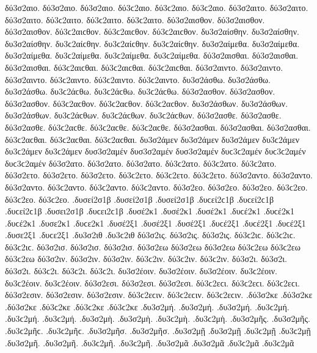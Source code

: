 {δύ3σ2αιο. δύ3σ2αιο. δύ3σ2αιο. δύ3ϲ2αιο. δύ3ϲ2αιο. δύ3ϲ2αιο. 
δύ3σ2αιτο. δύ3σ2αιτο. δύ3σ2αιτο. δύ3ϲ2αιτο. δύ3ϲ2αιτο. δύ3ϲ2αιτο. 
δύ3σ2αισθον. δύ3σ2αισθον. δύ3σ2αισθον. δύ3ϲ2αιϲθον. δύ3ϲ2αιϲθον. δύ3ϲ2αιϲθον. 
δυ3σ2αίσθην. δυ3σ2αίσθην. δυ3σ2αίσθην. δυ3ϲ2αίϲθην. δυ3ϲ2αίϲθην. δυ3ϲ2αίϲθην. 
δυ3σ2αίμεθα. δυ3σ2αίμεθα. δυ3σ2αίμεθα. δυ3ϲ2αίμεθα. δυ3ϲ2αίμεθα. δυ3ϲ2αίμεθα. 
δύ3σ2αισθαι. δύ3σ2αισθαι. δύ3σ2αισθαι. δύ3ϲ2αιϲθαι. δύ3ϲ2αιϲθαι. δύ3ϲ2αιϲθαι. 
δύ3σ2αιντο. δύ3σ2αιντο. δύ3σ2αιντο. δύ3ϲ2αιντο. δύ3ϲ2αιντο. δύ3ϲ2αιντο. 
δυ3σ2άσθω. δυ3σ2άσθω. δυ3σ2άσθω. δυ3ϲ2άϲθω. δυ3ϲ2άϲθω. δυ3ϲ2άϲθω. 
δύ3σ2ασθον. δύ3σ2ασθον. δύ3σ2ασθον. δύ3ϲ2αϲθον. δύ3ϲ2αϲθον. δύ3ϲ2αϲθον. 
δυ3σ2άσθων. δυ3σ2άσθων. δυ3σ2άσθων. δυ3ϲ2άϲθων. δυ3ϲ2άϲθων. δυ3ϲ2άϲθων. 
δύ3σ2ασθε. δύ3σ2ασθε. δύ3σ2ασθε. δύ3ϲ2αϲθε. δύ3ϲ2αϲθε. δύ3ϲ2αϲθε. 
δύ3σ2ασθαι. δύ3σ2ασθαι. δύ3σ2ασθαι. δύ3ϲ2αϲθαι. δύ3ϲ2αϲθαι. δύ3ϲ2αϲθαι. 
δυ3σ2άμεν δυ3σ2άμεν δυ3σ2άμεν δυ3ϲ2άμεν δυ3ϲ2άμεν δυ3ϲ2άμεν   %
δυσ3σ2αμέν δυσ3σ2αμέν δυσ3σ2αμέν δυϲ3ϲ2αμέν δυϲ3ϲ2αμέν δυϲ3ϲ2αμέν 
δύ3σ2ατο. δύ3σ2ατο. δύ3σ2ατο. δύ3ϲ2ατο. δύ3ϲ2ατο. δύ3ϲ2ατο.   %
δύ3σ2ετο. δύ3σ2ετο. δύ3σ2ετο. δύ3ϲ2ετο. δύ3ϲ2ετο. δύ3ϲ2ετο.   %
δύ3σ2αντο. δύ3σ2αντο. δύ3σ2αντο. δύ3ϲ2αντο. δύ3ϲ2αντο. δύ3ϲ2αντο.   %
δύ3σ2εο. δύ3σ2εο. δύ3σ2εο. δύ3ϲ2εο. δύ3ϲ2εο. δύ3ϲ2εο.   %
.δυσεί2σ1β .δυσεί2σ1β .δυσεί2σ1β .δυϲεί2ϲ1β .δυϲεί2ϲ1β .δυϲεί2ϲ1β   %
.δυσει2σ1β .δυϲει2ϲ1β 
.δυσέ2κ1 .δυσέ2κ1 .δυσέ2κ1 .δυϲέ2κ1 .δυϲέ2κ1 .δυϲέ2κ1   %
.δυσε2κ1 .δυϲε2κ1 
.δυσέ2ξ1 .δυσέ2ξ1 .δυσέ2ξ1 .δυϲέ2ξ1 .δυϲέ2ξ1 .δυϲέ2ξ1   %
.δυσε2ξ1 .δυϲε2ξ1 
.δυ3σ2ιθ .δυ3ϲ2ιθ   %
δύ3σ2ις. δύ3σ2ις. δύ3σ2ις. δύ3ϲ2ιϲ. δύ3ϲ2ιϲ. δύ3ϲ2ιϲ.   %
δύ3σ2ισ. δύ3σ2ισ. δύ3σ2ισ. 
δύ3σ2εω δύ3σ2εω δύ3σ2εω δύ3ϲ2εω δύ3ϲ2εω δύ3ϲ2εω 
δύ3σ2ιν. δύ3σ2ιν. δύ3σ2ιν. δύ3ϲ2ιν. δύ3ϲ2ιν. δύ3ϲ2ιν. 
δύ3σ2ι. δύ3σ2ι. δύ3σ2ι. δύ3ϲ2ι. δύ3ϲ2ι. δύ3ϲ2ι. 
δυ3σ2έοιν. δυ3σ2έοιν. δυ3σ2έοιν. δυ3ϲ2έοιν. δυ3ϲ2έοιν. δυ3ϲ2έοιν. 
δύ3σ2εσι. δύ3σ2εσι. δύ3σ2εσι. δύ3ϲ2εϲι. δύ3ϲ2εϲι. δύ3ϲ2εϲι. 
δύ3σ2εσιν. δύ3σ2εσιν. δύ3σ2εσιν. δύ3ϲ2εϲιν. δύ3ϲ2εϲιν. δύ3ϲ2εϲιν. 
.δύ3σ2κε .δύ3σ2κε .δύ3σ2κε .δύ3ϲ2κε .δύ3ϲ2κε .δύ3ϲ2κε   %
.δυ3σ2μή. .δυ3σ2μή. .δυ3σ2μή. .δυ3ϲ2μή. .δυ3ϲ2μή. .δυ3ϲ2μή.   %
.δυ3σ2μὴ. .δυ3σ2μὴ. .δυ3ϲ2μὴ. .δυ3ϲ2μὴ. 
.δυ3σ2μῆς. .δυ3σ2μῆς. .δυ3ϲ2μῆϲ. .δυ3ϲ2μῆϲ. 
.δυ3σ2μῆσ. .δυ3σ2μῆσ. 
.δυ3σ2μῇ .δυ3σ2μῇ .δυ3ϲ2μῇ .δυ3ϲ2μῇ 
.δυ3σ2μῆ. .δυ3σ2μῆ. .δυ3ϲ2μῆ. .δυ3ϲ2μῆ. 
.δυ3σ2μᾶ .δυ3σ2μᾶ .δυ3ϲ2μᾶ .δυ3ϲ2μᾶ 
}

